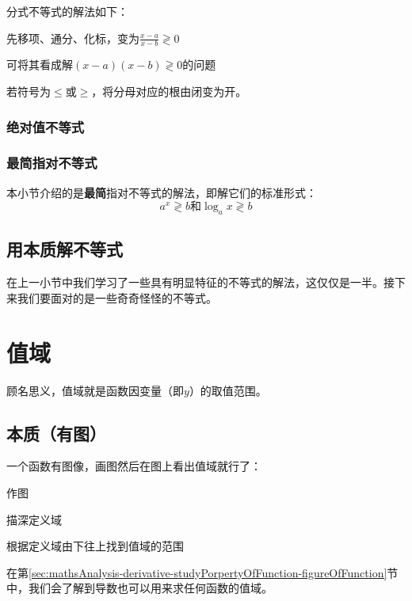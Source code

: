 分式不等式的解法如下：

\begin{enumlist}
	\item 先移项、通分、化标，变为$\frac{x-a}{x-b}\gtrless0$
	\item 可将其看成解$(x-a)(x-b)\gtrless0$的问题
\end{enumlist}

若符号为$\leq$或$\geq$，将分母对应的根由闭变为开。

\subsubsection{绝对值不等式}

\subsubsection{最简指对不等式}
本小节介绍的是\textbf{最简}指对不等式的解法，即解它们的标准形式：\[a^x\gtrless b\text{和}\log_ax\gtrless b\]

\subsection[本质]{用本质解不等式}
在上一小节中我们学习了一些具有明显特征的不等式的解法，这仅仅是一半。接下来我们要面对的是一些奇奇怪怪的不等式。

\section{值域}
顾名思义，值域就是函数因变量（即$y$）的取值范围。

\subsection[本质]{本质（有图）}
一个函数有图像，画图然后在图上看出值域就行了：

\begin{enumlist}
\item 作图
\item 描深定义域
\item 根据定义域由下往上找到值域的范围
\end{enumlist}

在第\ref{sec:mathsAnalysis-derivative-studyPorpertyOfFunction-figureOfFunction}节中，我们会了解到导数也可以用来求任何函数的值域。

